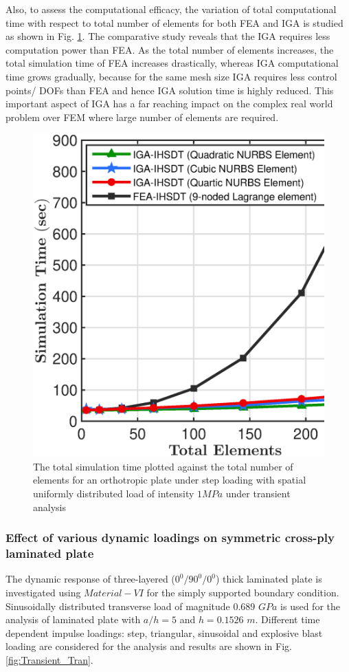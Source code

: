 \documentclass[3p,preprint,12pt]{elsarticle}
\begin{document}
Also, to assess the computational efficacy, the variation of total computational time with respect to total number of elements for both FEA and IGA is studied as shown in  Fig. \ref{fig:computational_efficiency_transient}. The comparative study reveals that the IGA requires less computation power than FEA. As the total number of elements increases, the total simulation time of FEA increases drastically, whereas IGA computational time grows gradually, because for the same mesh size IGA requires less control points/ DOFs than FEA and hence IGA solution time is highly reduced. This important aspect of IGA has a far reaching impact on the complex real world problem over FEM where large number of elements are required.
\begin{figure}
	\graphicspath{{./All_Images/}}
	\centering
	\includegraphics[scale=0.5]{Computational_Efficiency_Transient_IGA_FEM.eps}
	\caption{\label{fig:computational_efficiency_transient}The total simulation time plotted against the total number of elements for an orthotropic plate under step loading with spatial uniformly distributed load of intensity $1 MPa$ under transient analysis}
\end{figure}

\subsubsection{Effect of various dynamic loadings on symmetric cross-ply laminated plate}
The dynamic response of three-layered ($0^0/90^0/0^0$) thick laminated plate is investigated using $Material-VI$ for the simply supported boundary condition. Sinusoidally distributed transverse load of magnitude $0.689\,\,GPa$ is used for the analysis of laminated plate with $a/h=5$ and $h=0.1526\,\,m$. Different time dependent impulse loadings: step, triangular, sinusoidal and explosive blast loading are considered for the analysis and results are shown in Fig. \ref{fig:Transient_Tran}. 
\end{document}
